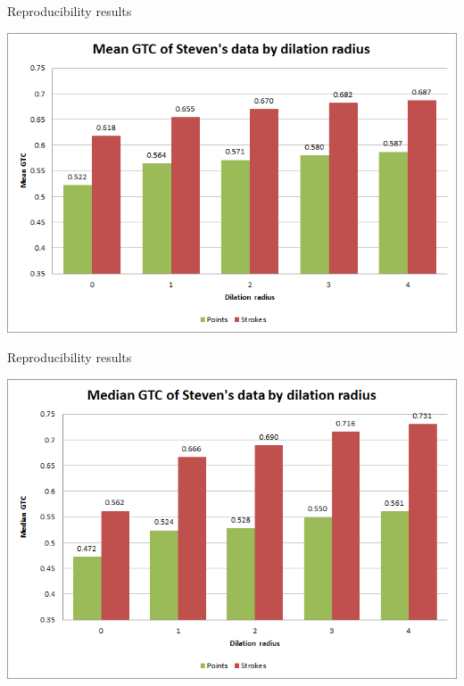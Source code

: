 \documentclass[14pt,xcolor=dvipsnames]{beamer}
\begin{document}
\begin{frame}[fragile,t]{Reproducibility results}
	\begin{center}
		\includegraphics[width=\paperheight]{steven_mean_gtc}
	\end{center}
\end{frame}

\begin{frame}[fragile,t]{Reproducibility results}
	\begin{center}
		\includegraphics[width=\paperheight]{steven_median_gtc}
	\end{center}
\end{frame}
\end{document}
